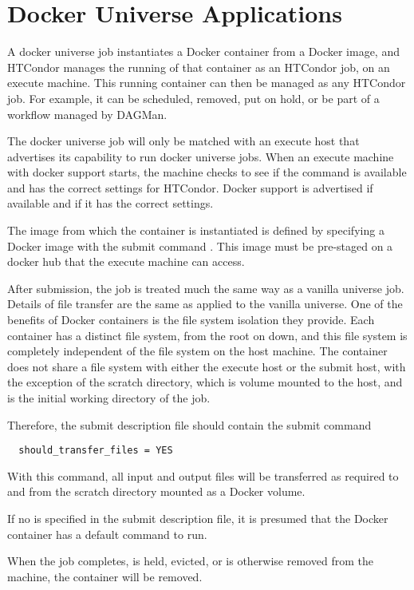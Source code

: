 \section{\label{sec:dockeruniverse}Docker Universe Applications}
A docker universe job instantiates a Docker container
from a Docker image, and HTCondor manages the running
of that container as an HTCondor job, on an execute machine.
This running container can then be managed as any HTCondor job.
For example, it can be scheduled, removed, put on hold, 
or be part of a workflow managed by DAGMan.

The docker universe job will only be matched with an execute host
that advertises its capability to run docker universe jobs.
When an execute machine with docker support starts, 
the machine checks to
see if the  command is available and has the correct
settings for HTCondor.  
Docker support is advertised if available and if it has the correct settings.

The image from which the container is instantiated is
defined by specifying a Docker image with the submit command
.  
This image must be pre-staged on a docker
hub that the execute machine can access.

After submission, the job is treated much the same way as a vanilla 
universe job.  
Details of file transfer are the same as applied to 
the vanilla universe.  
One of the benefits of Docker containers is 
the file system isolation they provide.  
Each container has a distinct file system, 
from the root on down, and this file
system is completely independent of the file system on the host machine.
The container does not share a file system with either the execute
host or the submit host, with the exception of the scratch directory,
which is volume mounted to the host, and is the initial working
directory of the job.

Therefore,
the submit description file should contain the submit command
\begin{verbatim}
  should_transfer_files = YES
\end{verbatim}
With this command,  all input and output files will be transferred
as required to and from the scratch directory mounted as a
Docker volume.

If no  is specified in the submit description file,
it is presumed that the Docker container has a default command to run.

When the job completes, is held, evicted, 
or is otherwise removed from the machine, the container will be removed.


